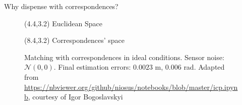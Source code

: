 \begin{frame}[noframenumbering]{Why dispense with correspondences?}


  \begin{figure}\vspace{1cm}
    \caption{Matching with correspondences in ideal conditions. Sensor noise:
             $\mathcal{N}(0,0)$. Final estimation errors: $0.0023$ m, $0.006$
             rad. Adapted from
             \url{https://nbviewer.org/github/niosus/notebooks/blob/master/icp.ipynb},
             courtesy of Igor Bogoslavskyi}
    \begin{textblock}{3}(4.4,3.2)
      \scriptsize Euclidean Space
    \end{textblock}
    \begin{textblock}{4}(8.4,3.2)
      \scriptsize Correspondences' space
    \end{textblock}
  \end{figure}

\end{frame}
